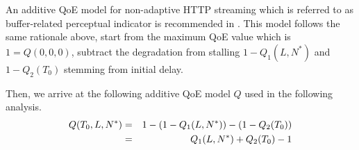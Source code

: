 An additive \gls{QoE} model for non-adaptive HTTP streaming which is referred to as buffer-related perceptual indicator is recommended in \cite{ITUT2012}. This model follows the same rationale above, start from the maximum QoE value which is \(1=Q(0,0,0)\), subtract the degradation from stalling \(1-Q_1(L,N^*)\) and \(1-Q_2(T_0)\) stemming from initial delay.

Then, we arrive at the following additive QoE model \(Q\) used in the following analysis.  
\begin{eqnarray}
  Q(T_0,L,N^*) &=& 1-(1-Q_1(L,N^*)) - (1-Q_2(T_0)) \notag\\
   &=& Q_1(L,N^*) + Q_2(T_0) - 1
\label{eq:application:qoe_user_behaviour:typical_user_scenarios:youtube_qoe:combined:qsum}
\end{eqnarray}
